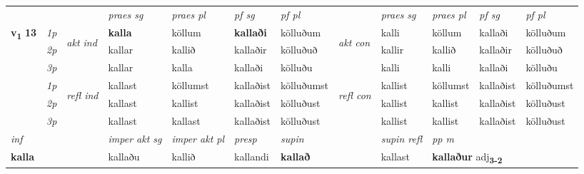 \begin{longtable}[l]{X>{\footnotesize\itshape}llXXXXlXXXX}
 & &   & \textit{praes sg}  & \textit{praes pl}    & \textit{ pf sg} & \textit{pf pl} & & \textit{praes sg}  & \textit{praes pl}    & \textit{pf sg} & \textit{pf pl }  \\ \cmidrule{4-7} \cmidrule{9-12}
 \multirow{2}{*}{{{\textbf{v{\textsubscript{1}}} \Large{\textbf{13}}}}}  & 1p & \multirow{3}{*}{\begin{turn}{90}\textit{akt ind}\end{turn}} & \textbf{kalla} & köllum & \textbf{kallaði} & kölluðum & \multirow{3}{*}{\begin{turn}{90}\textit{akt con}\end{turn}} &kalli & köllum & kallaði & kölluðum\\*
 & 2p &  &  kallar  & kallið & kallaðir & kölluðuð & & kallir & kallið & kallaðir & kölluðuð \\*
 & 3p &  & kallar & kalla & kallaði & kölluðu & & kalli & kalli& kallaði & kölluðu \\*
\cmidrule{4-7} \cmidrule{9-12}
 & 1p & \multirow{3}{*}{\begin{turn}{90}\textit{refl ind}\end{turn}}  & kallast & köllumst & kallaðist & kölluðumst & \multirow{3}{*}{\begin{turn}{90}\textit{refl con}\end{turn}}  &kallist & köllumst & kallaðist & kölluðumst \\*
 & 2p &  & kallast & kallist & kallaðist & kölluðust & &kallist & kallist & kallaðist & kölluðust \\*
 & 3p  & & kallast & kallast & kallaðist & kölluðust & & kallist & kallist& kallaðist & kölluðust \\*
\cmidrule{4-7} \cmidrule{9-12}

   {\textit{inf}} & &  & \textit{imper akt sg} & \textit{imper akt pl}   & \textit{presp} & \textit{supin} && \textit{supin refl} & \textit{pp m} \\*
  {\textbf{kalla}} & && kallaðu  & kallið   & kallandi &  \textbf{kallað} && kallast & \multicolumn{2}{l}{\textbf{kallaður} adj\textbf{\textsubscript{3-2}}} \\*

\midrule


\end{longtable}
